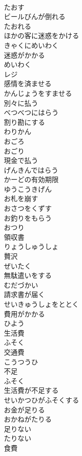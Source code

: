 \documentclass[8pt]{extreport}
\begin{document}
\begin{CJK}{UTF8}{min}
\\	たおす
\\	ビールびんが倒れる	
\\	たおれる
\\	ほかの客に迷惑をかける	
\\	きゃくにめいわく
\\	迷惑がかかる	
\\	めいわく
\\	レジ	
\\	感情を済ませる	
\\	かんじょうをすませる
\\	別々に払う	
\\	べつべつにはらう
\\	割り勘にする	
\\	わりかん
\\	おごろ	
\\	おごり	
\\	現金で払う	
\\	げんきんではらう
\\	かーどの有効期限	
\\	ゆうこうきげん
\\	お札を崩す	
\\	おさつをくずす
\\	お釣りをもらう	
\\	おつり
\\	領収書	
\\	りょうしゅうしょ
\\	贅沢	
\\	ぜいたく
\\	無駄遣いをする	
\\	むだづかい
\\	請求書が届く	
\\	せいきゅうしょをととく
\\	費用がかかる	
\\	ひよう
\\	生活費	
\\	ふそく
\\	交通費	
\\	こうつうひ
\\	不足	
\\	ふそく
\\	生活費が不足する	
\\	せいかつひがふそくする
\\	お金が足りる	
\\	おかねがたりる
\\	足りない	
\\	たりない
\\	食費	

\end{CJK}
\end{document}
